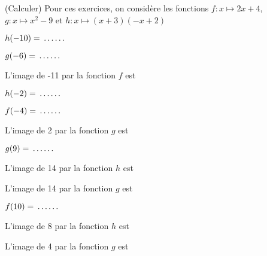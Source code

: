  (Calculer) Pour ces exercices, on considère les fonctions $f:x\mapsto 2x+4$, $g:x\mapsto x^2-9$ et $h:x\mapsto (x+3)(-x+2)$

\begin{multicols}{4}



$h(-10)=\fillin[1cm]$



$g(-6)=\fillin[1cm]$



L'image de -11 par la fonction $f$ est \fillin[1cm]



$h(-2)=\fillin[1cm]$



$f(-4)=\fillin[1cm]$



L'image de 2 par la fonction $g$ est \fillin[1cm]\columnbreak



$g(9)=\fillin[1cm]$



L'image de 14 par la fonction $h$ est \fillin[1cm]



L'image de 14 par la fonction $g$ est \fillin[1cm]\columnbreak



$f(10)=\fillin[1cm]$



L'image de 8 par la fonction $h$ est \fillin[1cm]



L'image de 4 par la fonction $g$ est \fillin[1cm]\columnbreak

\end{multicols}